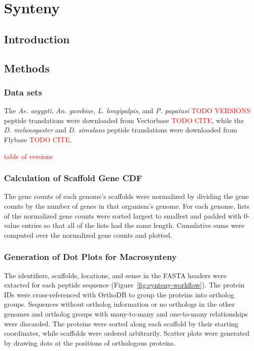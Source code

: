 \section{Synteny}

\subsection{Introduction}

\subsection{Methods}

\subsubsection{Data sets}


The \emph{Ae. aegypti}, \emph{An. gambiae}, \emph{L. longipalpis}, and \emph{P. papatasi} \textcolor{red}{TODO VERSIONS} peptide translations were downloaded from Vectorbase \textcolor{red}{TODO CITE}, while the \emph{D. melanogaster} and \emph{D. simulans} peptide translations were downloaded from Flybase \textcolor{red}{TODO CITE}.

\textcolor{red}{table of versions}


\subsubsection{Calculation of Scaffold Gene CDF}
The gene counts of each genome's scaffolds were normalized by dividing the gene counts by the number of genes in that organism's genome. For each genome, lists of the normalized gene counts were sorted largest to smallest and padded with 0-value entries so that all of the lists had the same length.  Cumulative sums were computed over the normalized gene counts and plotted.


\subsubsection{Generation of Dot Plots for Macrosynteny} \label{sec:synteny-methods-dotplots}
The identifiers, scaffolds, locations, and sense in the FASTA headers were extacted for each peptide sequence (Figure~\ref{fig:synteny-workflow}).  The protein IDs were cross-referenced with OrthoDB to group the proteins into ortholog groups.  Sequences without ortholog information or no orthologs in the other genomes and ortholog groups with many-to-many and one-to-many relationships were discarded.  The proteins were sorted along each scaffold by their starting coordinates, while scaffolds were ordered arbitrarily.  Scatter plots were generated by drawing dots at the positions of orthologous proteins.

